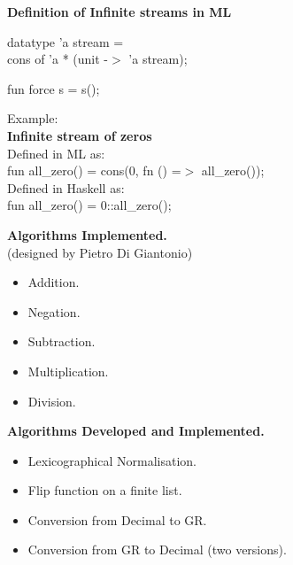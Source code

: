 \documentclass{csslides}\raggedright
\begin{document}
\begin{slide}{}
{\bf Definition of Infinite streams in ML}

datatype 'a stream =  \\
cons of 'a * (unit -$>$ 'a stream);


fun force s = s();



Example: \\
{\bf Infinite stream of zeros} \\
Defined in ML as: \\
fun all\_zero() = cons(\(0\), fn () =$>$ all\_zero()); \\

Defined in Haskell as: \\
fun all\_zero() = $0$::all\_zero();
\end{slide}

\begin{slide}{}
{\bf Algorithms Implemented.} \\
(designed by Pietro Di Giantonio) \\
\begin{itemize}
\item Addition. 
\item Negation.
\item Subtraction.
\item Multiplication.
\item Division.
\end{itemize}


{\bf Algorithms Developed and Implemented.}
\begin{itemize}
\item Lexicographical Normalisation.
\item Flip function on a finite list.
\item Conversion from Decimal to GR.
\item Conversion from GR to Decimal (two versions).
\end{itemize}
\end{slide}
\end{document}
